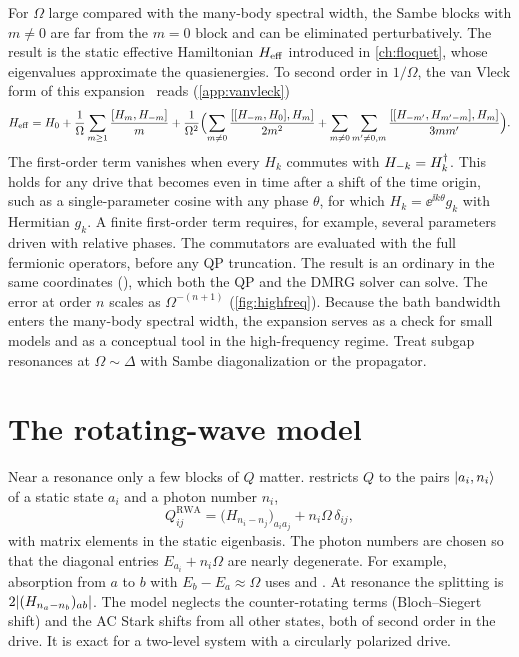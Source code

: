 For $\Omega$ large compared with the many-body spectral width, the Sambe blocks with
$m\ne0$ are far from the $m=0$ block and can be eliminated perturbatively. The result is the
static effective Hamiltonian $H_{\mathrm{eff}}$ introduced in \cref{ch:floquet}, whose eigenvalues approximate the
quasienergies. To second order in $1/\Omega$, the van Vleck form of this
expansion~\cite{eckardt2015high,bukov2015universal,goldman2014periodically,mikami2016brillouin}
reads (\cref{app:vanvleck})
\begin{equation}\label{eq:van-vleck}
  H_{\mathrm{eff}}=H_0+\frac1\Omega\sum_{m\ge1}\frac{[H_m,H_{-m}]}m
  +\frac1{\Omega^2}\Bigl(\sum_{m\ne0}\frac{[[H_{-m},H_0],H_m]}{2m^2}
  +\sum_{m\ne0}\sum_{m'\ne0,m}\frac{[[H_{-m'},H_{m'-m}],H_m]}{3mm'}\Bigr).
\end{equation}
The first-order term vanishes when every $H_k$ commutes with $H_{-k}=H_k^\dagger$. This holds
for any drive that becomes even in time after a shift of the time origin, such as a
single-parameter cosine with any phase $\theta$, for which $H_k=\ee^{\ii k\theta}g_k$ with
Hermitian $g_k$. A finite first-order term requires, for example, several parameters driven
with relative phases. The commutators are evaluated with the full
fermionic operators, before any QP truncation. The result is an ordinary
 in the same coordinates (), which both the
QP and the DMRG solver can solve. The error at order $n$ scales as $\Omega^{-(n+1)}$
(\cref{fig:highfreq}). Because the bath bandwidth enters the many-body spectral width, the
expansion serves as a check for small models and as a conceptual tool in the high-frequency
regime. Treat subgap resonances at $\Omega\sim\Delta$ with Sambe diagonalization or the propagator.

\section{The rotating-wave model}\label{sec:rwa}

Near a resonance only a few blocks of $Q$ matter. 
restricts $Q$ to the pairs $\lvert a_i,n_i\rangle$ of a static state $a_i$ and a photon number $n_i$,
\begin{equation}\label{eq:rwa}
  Q^{\mathrm{RWA}}_{ij}=\bigl(H_{n_i-n_j}\bigr)_{a_ia_j}+n_i\Omega\,\delta_{ij},
\end{equation}
with matrix elements in the static eigenbasis. The photon numbers are chosen so that the
diagonal entries $E_{a_i}+n_i\Omega$ are nearly degenerate. For example, absorption from $a$
to $b$ with $E_b-E_a\approx\Omega$ uses  and . At
resonance the splitting is $2\lvert (H_{n_a-n_b})_{ab}\rvert$. The model neglects the
counter-rotating terms (Bloch--Siegert shift) and the AC Stark shifts from all other
states, both of second order in the drive. It is exact for a two-level system with a
circularly polarized drive.

